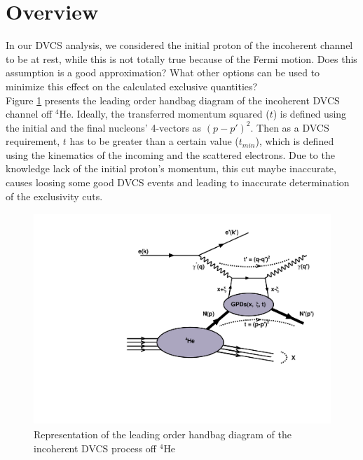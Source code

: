 \documentclass[a4paper,11pt,twoside]{article}
\author{M. Hattawy}
\date{\today}
\begin{document}
\title{}
\maketitle

\section{Overview}
In our DVCS analysis, we considered the initial proton of the incoherent 
channel to be at rest, while this is not totally true because of the Fermi 
motion. Does this assumption is a good approximation? What other options can be 
used to minimize this effect on the calculated exclusive quantities?\\

Figure \ref{fig:handbag} presents the leading order handbag diagram of the 
incoherent DVCS channel off $^4$He. Ideally, the transferred momentum squared 
($t$) is defined using the initial and the final nucleons' 4-vectors as 
$(p-p')^{2}$. Then as a DVCS requirement, $t$ has to be greater than a certain 
value ($t_{min}$), which is defined using the kinematics of the incoming and 
the scattered electrons. Due to the knowledge lack of the initial proton's 
momentum, this cut maybe inaccurate, causes loosing some good DVCS events and 
leading to inaccurate determination of the exclusivity cuts.\\ 

\begin{figure}[h!]
\centering
   \includegraphics[height=8.0cm]{fig/handbag_incoherent.pdf}
\caption{Representation of the leading order handbag diagram of the incoherent 
DVCS process off $^4$He}
\label{fig:handbag}
\end{figure}
\end{document}

